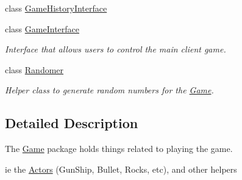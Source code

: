 \begin{DoxyCompactItemize}
\item 
class \hyperlink{classAsteroids_1_1Domain_1_1Game_1_1GameHistoryInterface}{Game\+History\+Interface}
\item 
class \hyperlink{classAsteroids_1_1Domain_1_1Game_1_1GameInterface}{Game\+Interface}
\begin{DoxyCompactList}\small\item\em Interface that allows users to control the main client game. \end{DoxyCompactList}\item 
class \hyperlink{classAsteroids_1_1Domain_1_1Game_1_1Randomer}{Randomer}
\begin{DoxyCompactList}\small\item\em Helper class to generate random numbers for the \hyperlink{classAsteroids_1_1Domain_1_1Game_1_1Game}{Game}. \end{DoxyCompactList}\end{DoxyCompactItemize}


\subsection{Detailed Description}
The \hyperlink{classAsteroids_1_1Domain_1_1Game_1_1Game}{Game} package holds things related to playing the game. 

ie the \hyperlink{namespaceAsteroids_1_1Domain_1_1Game_1_1Actors}{Actors} (Gun\+Ship, Bullet, Rocks, etc), and other helpers 
